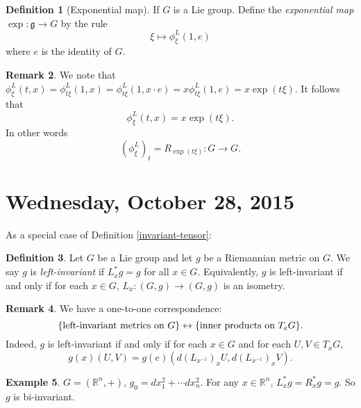 \documentclass{amsart}
\numberwithin{equation}{section}
\newcommand{\bR}{\mathbb{R}}
\theoremstyle{definition}
\newtheorem{definition}{Definition} [section]
\newtheorem{example}[definition]{Example}
\newtheorem{remark}[definition]{Remark}
\theoremstyle{theorem}
\begin{document}
\begin{definition}[Exponential map]
If $G$ is a Lie group. Define the {\em exponential map} $\exp : \mathfrak{g} \to G$ by the rule 
\[
\xi \mapsto \phi_\xi^L(1,e)
\]
where $e$ is the identity of $G$. 
\end{definition}

\begin{remark}
We note that $\phi_\xi^L(t,x) = \phi_{t\xi}^L(1,x) = \phi_{t\xi}^L(1,x\cdot e) = x \phi_{t\xi}^L(1,e)=  x \exp(t\xi)$. It follows that 
\[
\phi_\xi^L(t,x) = x \exp(t\xi).
\]
In other words 
\[
(\phi_\xi^L)_t = R_{\exp(t\xi)} : G \to G. 
\]
\end{remark}




\section{Wednesday, October 28, 2015}

As a special case of Definition \ref{invariant-tensor}:

\begin{definition}
Let $G$ be a Lie group and let $g$ be a Riemannian metric on $G$.   We say $g$ is {\em left-invariant} if 
$L_x^*g=g$ for all $x\in G$. Equivalently, $g$ is left-invariant if and only if for each $x\in G$, 
$L_x: (G,g)\to (G,g)$ is an isometry.
\end{definition}

\begin{remark} We have a one-to-one correspondence:
$$
\{ \textup{left-invariant metrics on }G\} \leftrightarrow \{ \textup{inner products on }T_eG\}.
$$
Indeed, $g$ is left-invariant if and only if for each $x \in G$ and for each $U,V \in T_xG$,  
\[
g(x)(U,V) = g(e)(d(L_{x^{-1}})_xU,d(L_{x^{-1}})_xV ).
\]
\end{remark}

\begin{example} $G=(\bR^n, +)$, $g_0=dx_1^2+\cdots dx_n^2$. 
For any $x\in \bR^n$, $L_x^*g=R_x^*g=g$. So $g$ is bi-invariant.
\end{example}
\end{document}
